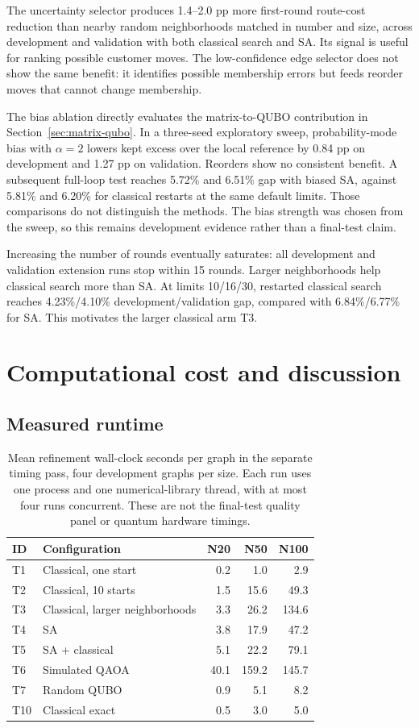 \documentclass[11pt,a4paper]{article}
\begin{document}
The uncertainty selector produces 1.4--2.0 pp more first-round route-cost
reduction than nearby random neighborhoods matched in number and size,
across development and validation with both classical search and SA. Its
signal is useful for ranking possible customer moves. The low-confidence
edge selector does not show the same benefit: it identifies possible
membership errors but feeds reorder moves that cannot change membership.

The bias ablation directly evaluates the matrix-to-QUBO contribution in
Section~\ref{sec:matrix-qubo}. In a three-seed exploratory sweep,
probability-mode bias with $\alpha=2$ lowers kept excess over the local
reference by 0.84 pp on development and 1.27 pp on validation. Reorders
show no consistent benefit. A subsequent full-loop test reaches 5.72\%
and 6.51\% gap with biased SA, against 5.81\% and 6.20\% for classical
restarts at the same default limits. Those comparisons do not distinguish
the methods. The bias strength was chosen from the sweep, so this remains
development evidence rather than a final-test claim.

Increasing the number of rounds eventually saturates: all development and
validation extension runs stop within 15 rounds. Larger neighborhoods help
classical search more than SA. At limits 10/16/30, restarted classical
search reaches 4.23\%/4.10\% development/validation gap, compared with
6.84\%/6.77\% for SA. This motivates the larger classical arm T3.

\section{Computational cost and discussion}
\subsection{Measured runtime}

\begin{table}[tbp]
\centering\small
\caption{Mean refinement wall-clock seconds per graph in the separate
timing pass, four development graphs per size. Each run uses one process
and one numerical-library thread, with at most four runs concurrent.
These are not the final-test quality panel or quantum hardware timings.}
\label{tab:timing}
\begin{tabular}{@{}llrrr@{}}
\toprule
ID & Configuration & N20 & N50 & N100\\
\midrule
T1 & Classical, one start & 0.2 & 1.0 & 2.9\\
T2 & Classical, 10 starts & 1.5 & 15.6 & 49.3\\
T3 & Classical, larger neighborhoods & 3.3 & 26.2 & 134.6\\
T4 & SA & 3.8 & 17.9 & 47.2\\
T5 & SA + classical & 5.1 & 22.2 & 79.1\\
T6 & Simulated QAOA & 40.1 & 159.2 & 145.7\\
T7 & Random QUBO & 0.9 & 5.1 & 8.2\\
T10 & Classical exact & 0.5 & 3.0 & 5.0\\
\bottomrule
\end{tabular}
\end{table}
\end{document}

